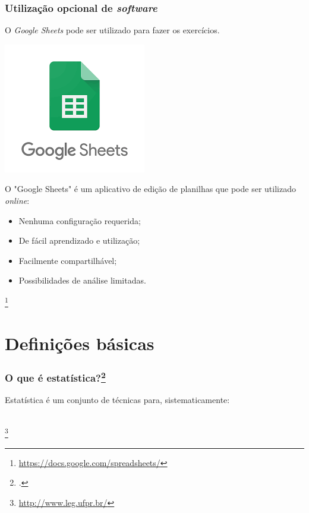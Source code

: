\documentclass[11pt]{beamer}
\newcommand\blfootnote[1]{%
  \begingroup
  \renewcommand\thefootnote{}\footnote{#1}%
  \addtocounter{footnote}{-1}%
  \endgroup
}
\begin{document}
\begin{frame}
\frametitle{Utilização opcional de \textit{software}}
O \textit{Google Sheets} pode ser utilizado para fazer os exercícios.

\begin{center}\includegraphics[width=0.2\linewidth]{figs/google_sheet.png} \end{center}

O "Google Sheets" é um aplicativo de edição de planilhas que pode ser utilizado \textit{online}:
\begin{itemize}
\item Nenhuma configuração requerida;
\item De fácil aprendizado e utilização;
\item Facilmente compartilhável;
\item Possibilidades de análise limitadas.
\end{itemize} 

\blfootnote{\url{https://docs.google.com/spreadsheets/}}
\end{frame}


\section{Definições básicas}
\begin{frame}
\frametitle{O que é estatística?\footcite{magalhaes2002noccoes}}
Estatística é um conjunto de técnicas para, sistematicamente:
\\~\\
  \begin{itemize}
  \end{itemize}
\blfootnote{\url{http://www.leg.ufpr.br/}}
\end{frame}
\end{document}
